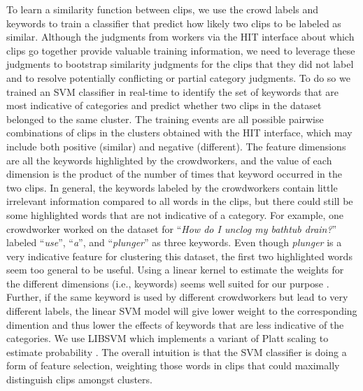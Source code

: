 To learn a similarity function between clips, we use the crowd
labels and keywords to train a classifier that predict how likely two clips
to be labeled as similar.
Although the judgments from workers via the HIT interface about which clips go together provide valuable training information, we need to leverage these judgments to bootstrap similarity judgments for the clips that they did not label and to resolve potentially conflicting or partial category judgments. 
To do so we trained an SVM classifier in real-time to identify the set of keywords that are most indicative of categories and predict whether two clips in the dataset belonged to the same cluster.  
The training events
are all possible pairwise combinations of clips in the clusters obtained with the HIT interface,
which may include both positive (similar) and negative (different).
The feature dimensions are all the keywords highlighted by the
crowdworkers, and the value of each dimension is the product of
the number of times that keyword occurred in the two clips.
In general,  the keywords labeled by the crowdworkers contain little irrelevant information
compared to all words in the clips, but there could
still be some highlighted words that are not indicative of a category. For
example, one crowdworker worked on the dataset for ``\emph{How do I unclog my
	bathtub drain?}'' labeled ``\emph{use}'', ``\emph{a}'', and ``\emph{plunger}'' as
three keywords. Even though \emph{plunger} is a very
indicative feature for clustering this dataset, the first two highlighted words
seem too general to be useful. 
Using a linear kernel to
estimate the weights for the different dimensions (i.e., keywords) seems well suited for
our purpose \cite{chang2011libsvm, wu2004probability}.
Further, if the same keyword is used by different crowdworkers but lead to
very different labels, the linear SVM model will give lower weight to the corresponding dimention and
thus lower the effects of keywords that are less indicative of the categories.
We use LIBSVM which
implements a variant of Platt scaling to estimate probability 
\cite{lin2007note,platt1999probabilistic}. The overall intuition is that the SVM classifier is doing a form of feature selection, weighting those words in clips that could maximally distinguish clips amongst clusters. 





